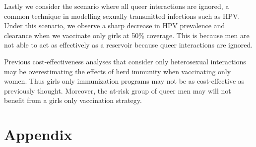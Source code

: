 \documentclass[12pt]{article}
\begin{document}
Lastly we consider the scenario where all queer interactions are ignored, a common technique in modelling sexually transmitted infections such as HPV.  Under this scenario, we observe a sharp decrease in HPV prevalence and clearance when we vaccinate only girls at 50\% coverage.  This is because men are not able to act as effectively as a reservoir because queer interactions are ignored.  

Previous cost-effectiveness analyses that consider only heterosexual interactions may be overestimating the effects of herd immunity when vaccinating only women.  Thus girls only immunization programs may not be as cost-effective as previously thought.  Moreover, the at-risk group of queer men may will not benefit from a girls only vaccination strategy. 

\newpage


\newpage

\section*{Appendix} 
\end{document}
